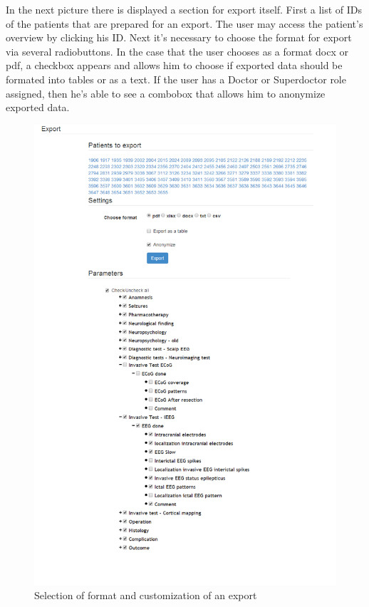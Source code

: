 \documentclass[thesis=B,english]{FITthesis}[2012/10/20]
\begin{document}
In the next picture there is displayed a section for export itself. First a list of IDs of the patients that are prepared for an export. The user may access the patient's overview by clicking his ID. Next it's necessary to choose the format for export via several radiobuttons. In the case that the user chooses as a format docx or pdf, a checkbox appears and allows him to choose if exported data should be formated into tables or as a text. If the user has a Doctor or Superdoctor role assigned, then he's able to see a combobox that allows him to anonymize exported data.

\begin{figure}
	\centering
 	\includegraphics[width=1\textwidth]{images/export.png}
 	\caption{Selection of format and customization of an export}
 	\label{fig:export}
\end{figure}
\end{document}
